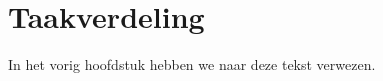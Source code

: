 \chapter{Taakverdeling}
In het vorig hoofdstuk hebben we naar deze tekst verwezen\label{verwijzing}.
